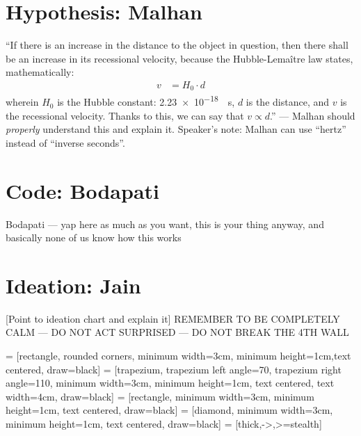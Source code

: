 \documentclass{article}
\begin{document}
\section{Hypothesis: Malhan}
\enquote{If there is an increase in the distance to the object in question, then there shall be an increase in its recessional velocity, because the Hubble-Lemaître law states, mathematically:
\begin{align}
    v &= H_0 \cdot d
\end{align}
wherein \(H_0\) is the Hubble constant: \qty{2.23e-18}{\per\second}, \(d\) is the distance, and \(v\) is the recessional velocity. Thanks to this, we can say that \(v \propto d\).} --- Malhan should \emph{properly} understand this and explain it. Speaker's note: Malhan can use \enquote{hertz} instead of \enquote{inverse seconds}.
\section{Code: Bodapati}
Bodapati --- yap here as much as you want, this is your thing anyway, and basically none of us know how this works
\section{Ideation: Jain}
[Point to ideation chart and explain it]
REMEMBER TO BE COMPLETELY CALM --- DO NOT ACT SURPRISED --- DO NOT BREAK THE 4TH WALL
\usetikzlibrary{shapes.geometric, arrows}

 = [rectangle, rounded corners, minimum width=3cm, minimum height=1cm,text centered, draw=black]
 = [trapezium, trapezium left angle=70, trapezium right angle=110, minimum width=3cm, minimum height=1cm, text centered, text width=4cm, draw=black]
 = [rectangle, minimum width=3cm, minimum height=1cm, text centered, draw=black]
 = [diamond, minimum width=3cm, minimum height=1cm, text centered, draw=black]
 = [thick,->,>=stealth]
\end{document}
